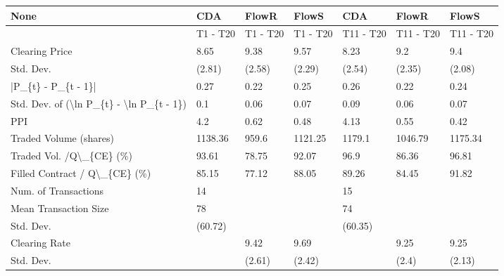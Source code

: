 \begin{tabular}{lllllll}
\hline
 None                                                      & CDA      & FlowR    & FlowS    & CDA       & FlowR     & FlowS     \\
\hline
                                                           & T1 - T20 & T1 - T20 & T1 - T20 & T11 - T20 & T11 - T20 & T11 - T20 \\
 Clearing Price                                            & 8.65     & 9.38     & 9.57     & 8.23      & 9.2       & 9.4       \\
 Std. Dev.                                                 & (2.81)   & (2.58)   & (2.29)   & (2.54)    & (2.35)    & (2.08)    \\
 |P\_\{t\} - P\_\{t - 1\}|                                       & 0.27     & 0.22     & 0.25     & 0.26      & 0.22      & 0.24      \\
 Std. Dev. of (\textbackslash{}ln P\_\{t\} - \textbackslash{}ln P\_\{t - 1\})                  & 0.1      & 0.06     & 0.07     & 0.09      & 0.06      & 0.07      \\
 PPI                                                       & 4.2      & 0.62     & 0.48     & 4.13      & 0.55      & 0.42      \\
 Traded Volume (shares)                                    & 1138.36  & 959.6    & 1121.25  & 1179.1    & 1046.79   & 1175.34   \\
 Traded Vol. /Q\textbackslash{}\_\{CE\} (\%)                                  & 93.61    & 78.75    & 92.07    & 96.9      & 86.36     & 96.81     \\
 Filled Contract / Q\textbackslash{}\_\{CE\} (\%)                             & 85.15    & 77.12    & 88.05    & 89.26     & 84.45     & 91.82     \\
 Num. of Transactions                                      & 14       &          &          & 15        &           &           \\
 Mean Transaction Size                                     & 78       &          &          & 74        &           &           \\
 Std. Dev.                                                 & (60.72)  &          &          & (60.35)   &           &           \\
 Clearing Rate                                             &          & 9.42     & 9.69     &           & 9.25      & 9.25      \\
 Std. Dev.                                                 &          & (2.61)   & (2.42)   &           & (2.4)     & (2.13)    \\

\end{tabular}
